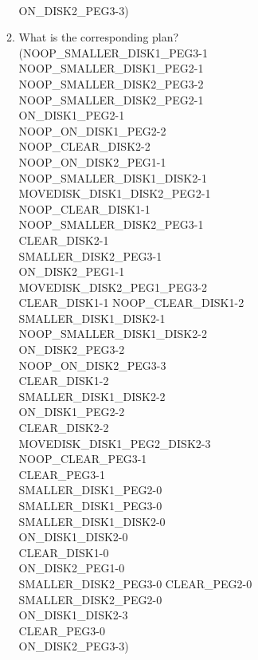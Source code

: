 \documentclass[12pt,letterpaper]{ntdhw}
\begin{document}
\begin{enumerate}
\begin{enumerate}
\\ON\_DISK2\_PEG3\mbox{-}3)
\item What is the corresponding plan?
  \\(NOOP\_SMALLER\_DISK1\_PEG3\mbox{-}1 
\\NOOP\_SMALLER\_DISK1\_PEG2\mbox{-}1 
\\NOOP\_SMALLER\_DISK2\_PEG3\mbox{-}2
\\NOOP\_SMALLER\_DISK2\_PEG2\mbox{-}1 
\\ON\_DISK1\_PEG2\mbox{-}1 
\\NOOP\_ON\_DISK1\_PEG2\mbox{-}2
\\NOOP\_CLEAR\_DISK2\mbox{-}2
\\NOOP\_ON\_DISK2\_PEG1\mbox{-}1
\\NOOP\_SMALLER\_DISK1\_DISK2\mbox{-}1
\\MOVEDISK\_DISK1\_DISK2\_PEG2\mbox{-}1
\\NOOP\_CLEAR\_DISK1\mbox{-}1
\\NOOP\_SMALLER\_DISK2\_PEG3\mbox{-}1
\\CLEAR\_DISK2\mbox{-}1
\\SMALLER\_DISK2\_PEG3\mbox{-}1
\\ON\_DISK2\_PEG1\mbox{-}1 
\\MOVEDISK\_DISK2\_PEG1\_PEG3\mbox{-}2
\\CLEAR\_DISK1\mbox{-}1 NOOP\_CLEAR\_DISK1\mbox{-}2 
\\SMALLER\_DISK1\_DISK2\mbox{-}1
\\NOOP\_SMALLER\_DISK1\_DISK2\mbox{-}2 
\\ON\_DISK2\_PEG3\mbox{-}2 
\\NOOP\_ON\_DISK2\_PEG3\mbox{-}3 
\\CLEAR\_DISK1\mbox{-}2
\\SMALLER\_DISK1\_DISK2\mbox{-}2
\\ON\_DISK1\_PEG2\mbox{-}2 
\\CLEAR\_DISK2\mbox{-}2 
\\MOVEDISK\_DISK1\_PEG2\_DISK2\mbox{-}3 
\\NOOP\_CLEAR\_PEG3\mbox{-}1
\\CLEAR\_PEG3\mbox{-}1 
\\SMALLER\_DISK1\_PEG2\mbox{-}0
\\SMALLER\_DISK1\_PEG3\mbox{-}0 
\\SMALLER\_DISK1\_DISK2\mbox{-}0 
\\ON\_DISK1\_DISK2\mbox{-}0 
\\CLEAR\_DISK1\mbox{-}0
\\ON\_DISK2\_PEG1\mbox{-}0 
\\SMALLER\_DISK2\_PEG3\mbox{-}0 CLEAR\_PEG2\mbox{-}0 
\\SMALLER\_DISK2\_PEG2\mbox{-}0
\\ON\_DISK1\_DISK2\mbox{-}3 
\\CLEAR\_PEG3\mbox{-}0 
\\ON\_DISK2\_PEG3\mbox{-}3)
    \end{enumerate}


\end{enumerate}
\end{document}
